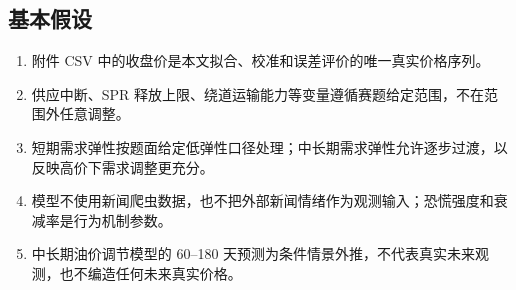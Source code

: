 \subsection{基本假设}

\begin{enumerate}
  \item 附件 CSV 中的收盘价是本文拟合、校准和误差评价的唯一真实价格序列。
  \item 供应中断、SPR 释放上限、绕道运输能力等变量遵循赛题给定范围，不在范围外任意调整。
  \item 短期需求弹性按题面给定低弹性口径处理；中长期需求弹性允许逐步过渡，以反映高价下需求调整更充分。
  \item 模型不使用新闻爬虫数据，也不把外部新闻情绪作为观测输入；恐慌强度和衰减率是行为机制参数。
  \item 中长期油价调节模型的 60--180 天预测为条件情景外推，不代表真实未来观测，也不编造任何未来真实价格。
\end{enumerate}

